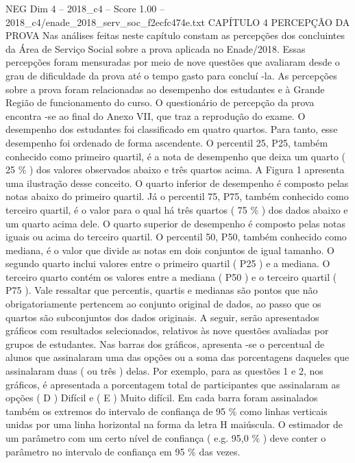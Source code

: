 \begin{textsample}{NEG Dim 4 – 2018\_c4 – Score 1.00 – 2018\_c4/enade\_2018\_serv\_soc\_f2ecfc474e.txt}  \label{ex:f4_neg_175}
CAPÍTULO 4 PERCEPÇÃO DA PROVA Nas análises feitas neste capítulo constam as percepções dos concluintes da Área de Serviço Social sobre a prova aplicada no Enade/2018.
Essas percepções foram mensuradas por meio de nove questões que avaliaram desde o grau de dificuldade da prova até o tempo gasto para concluí -la.
As percepções sobre a prova foram relacionadas ao desempenho dos estudantes e à Grande Região de funcionamento do curso.
O questionário de percepção da prova encontra -se ao final do Anexo VII, que traz a reprodução do exame.
O desempenho dos estudantes foi classificado em quatro quartos.
Para tanto, esse desempenho foi ordenado de forma ascendente.
O percentil 25, P25, também conhecido como primeiro quartil, é a nota de desempenho que deixa um quarto ( 25 \% ) dos valores observados abaixo e três quartos acima.
A Figura 1 apresenta uma ilustração desse conceito.
O quarto inferior de desempenho é composto pelas notas abaixo do primeiro quartil.
Já o percentil 75, P75, também conhecido como terceiro quartil, é o valor para o qual há três quartos ( 75 \% ) dos dados abaixo e um quarto acima dele.
O quarto superior de desempenho é composto pelas notas iguais ou acima do terceiro quartil.
O percentil 50, P50, também conhecido como mediana, é o valor que divide as notas em dois conjuntos de igual tamanho.
O segundo quarto inclui valores entre o primeiro quartil ( P25 ) e a mediana.
O terceiro quarto contém os valores entre a mediana ( P50 ) e o terceiro quartil ( P75 ).
Vale ressaltar que percentis, quartis e medianas são pontos que não obrigatoriamente pertencem ao conjunto original de dados, ao passo que os quartos são subconjuntos dos dados originais.
A seguir, serão apresentados gráficos com resultados selecionados, relativos às nove questões avaliadas por grupos de estudantes.
Nas barras dos gráficos, apresenta -se o percentual de alunos que assinalaram uma das opções ou a soma das porcentagens daqueles que assinalaram duas ( ou três ) delas.
Por exemplo, para as questões 1 e 2, nos gráficos, é apresentada a porcentagem total de participantes que assinalaram as opções ( D ) Difícil e ( E ) Muito difícil.
Em cada barra foram assinalados também os extremos do intervalo de confiança de 95 \% como linhas verticais unidas por uma linha horizontal na forma da letra H maiúscula.
O estimador de um parâmetro com um certo nível de confiança ( e.g. 95,0 \% ) deve conter o parâmetro no intervalo de confiança em 95 \% das vezes.

\end{textsample}
